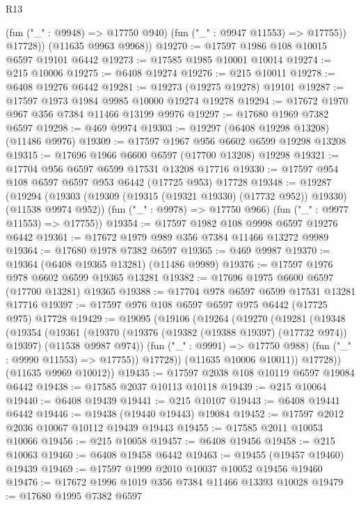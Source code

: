 \begin{lexlean}{R13}
\begin{coremodule}
            (fun ("_" : @9948) => @17750 @940)
            (fun ("_" : @9947 @11553) => @17755))
          @17728))
      (@11635 @9963 @9968))
@19270 := @17597 @1986 @108 @10015 @6597 @19101 @6442
@19273 := @17585 @1985 @10001 @10014
@19274 := @215 @10006
@19275 := @6408 @19274
@19276 := @215 @10011
@19278 := @6408 @19276 @6442
@19281 := @19273 (@19275 @19278) @19101
@19287 := @17597 @1973 @1984 @9985 @10000 @19274 @19278
@19294 := @17672 @1970 @967 @356 @7384 @11466 @13199 @9976
@19297 := @17680 @1969 @7382 @6597
@19298 := @469 @9974
@19303 := @19297 (@6408 @19298 @13208) (@11486 @9976)
@19309 := @17597 @1967 @956 @6602 @6599 @19298 @13208
@19315 := @17696 @1966 @6600 @6597 (@17700 @13208) @19298
@19321 := @17704 @956 @6597 @6599 @17531 @13208 @17716
@19330 := @17597 @954 @108 @6597 @6597 @953 @6442 (@17725 @953) @17728
@19348 := @19287
    (@19294
      (@19303 (@19309 (@19315 (@19321 @19330) (@17732 @952)) @19330) (@11538 @9974 @952))
      (fun ("_" : @9978) => @17750 @966)
      (fun ("_" : @9977 @11553) => @17755))
@19354 := @17597 @1982 @108 @9998 @6597 @19276 @6442
@19361 := @17672 @1979 @989 @356 @7384 @11466 @13272 @9989
@19364 := @17680 @1978 @7382 @6597
@19365 := @469 @9987
@19370 := @19364 (@6408 @19365 @13281) (@11486 @9989)
@19376 := @17597 @1976 @978 @6602 @6599 @19365 @13281
@19382 := @17696 @1975 @6600 @6597 (@17700 @13281) @19365
@19388 := @17704 @978 @6597 @6599 @17531 @13281 @17716
@19397 := @17597 @976 @108 @6597 @6597 @975 @6442 (@17725 @975) @17728
@19429 := @19095
    (@19106
      (@19264
        (@19270
          (@19281
            (@19348
              (@19354
                (@19361
                  (@19370
                    (@19376 (@19382 (@19388 @19397) (@17732 @974)) @19397)
                    (@11538 @9987 @974))
                  (fun ("_" : @9991) => @17750 @988)
                  (fun ("_" : @9990 @11553) => @17755))
                @17728))
            (@11635 @10006 @10011))
          @17728))
      (@11635 @9969 @10012))
@19435 := @17597 @2038 @108 @10119 @6597 @19084 @6442
@19438 := @17585 @2037 @10113 @10118
@19439 := @215 @10064
@19440 := @6408 @19439
@19441 := @215 @10107
@19443 := @6408 @19441 @6442
@19446 := @19438 (@19440 @19443) @19084
@19452 := @17597 @2012 @2036 @10067 @10112 @19439 @19443
@19455 := @17585 @2011 @10053 @10066
@19456 := @215 @10058
@19457 := @6408 @19456
@19458 := @215 @10063
@19460 := @6408 @19458 @6442
@19463 := @19455 (@19457 @19460) @19439
@19469 := @17597 @1999 @2010 @10037 @10052 @19456 @19460
@19476 := @17672 @1996 @1019 @356 @7384 @11466 @13393 @10028
@19479 := @17680 @1995 @7382 @6597

\end{coremodule}
\end{lexlean}
